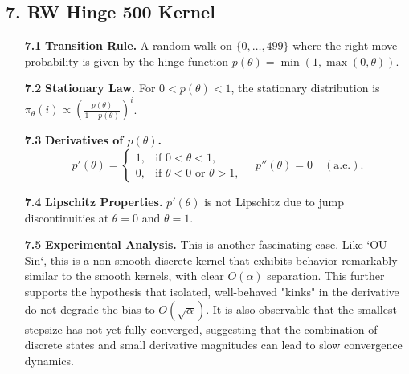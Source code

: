 \documentclass[a4paper]{article}
\begin{document}
\subsection*{7. RW Hinge 500 Kernel}
\begin{itemize}
	\item[\bfseries 7.1] \textbf{Transition Rule.} A random walk on \(\{0,\dots,499\}\) where the right-move probability is given by the hinge function \(p(\theta) = \min(1, \max(0, \theta))\).
	\item[\bfseries 7.2] \textbf{Stationary Law.} For \(0 < p(\theta) < 1\), the stationary distribution is \(\pi_\theta(i) \propto \left(\frac{p(\theta)}{1-p(\theta)}\right)^i\).
	\item[\bfseries 7.3] \textbf{Derivatives of \(p(\theta)\).}
	\[
	p'(\theta)=
	\begin{cases}
		1, & \text{if } 0 < \theta < 1, \\
		0, & \text{if } \theta < 0\text{ or }\theta > 1,
	\end{cases}
	\quad p''(\theta)=0 \quad (\text{a.e.}).
	\]
	\item[\bfseries 7.4] \textbf{Lipschitz Properties.} \(p'(\theta)\) is not Lipschitz due to jump discontinuities at \(\theta=0\) and \(\theta=1\).
	\item[\bfseries 7.5] \textbf{Experimental Analysis.} This is another fascinating case. Like `OU Sin`, this is a non-smooth discrete kernel that exhibits behavior remarkably similar to the smooth kernels, with clear \(O(\alpha)\) separation. This further supports the hypothesis that isolated, well-behaved "kinks" in the derivative do not degrade the bias to \(O(\sqrt{\alpha})\). It is also observable that the smallest stepsize has not yet fully converged, suggesting that the combination of discrete states and small derivative magnitudes can lead to slow convergence dynamics.
\end{itemize}
\end{document}
